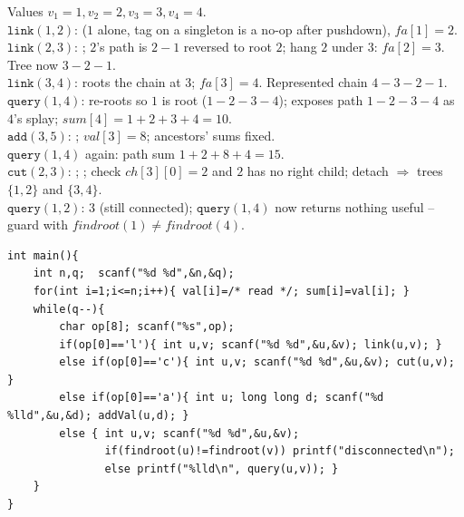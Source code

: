 \begin{tracebox}
Values \(v_1{=}1,v_2{=}2,v_3{=}3,v_4{=}4\).\\
\(\texttt{link}(1,2)\):  (\(1\) alone, tag on a singleton is a
no-op after pushdown), \(\mathit{fa}[1]{=}2\).\\
\(\texttt{link}(2,3)\): ; \(2\)'s path is \(2\!-\!1\) reversed to
root \(2\); hang \(2\) under \(3\): \(\mathit{fa}[2]{=}3\). Tree now \(3\!-\!2\!-\!1\).\\
\(\texttt{link}(3,4)\):  roots the chain at \(3\); \(\mathit{fa}[3]{=}4\).
Represented chain \(4\!-\!3\!-\!2\!-\!1\).\\
\(\texttt{query}(1,4)\):  re-roots so \(1\) is root
(\(1\!-\!2\!-\!3\!-\!4\));  exposes path \(1\!-\!2\!-\!3\!-\!4\) as
\(4\)'s splay; \(\mathit{sum}[4]=1{+}2{+}3{+}4=\boxed{10}\).\\
\(\texttt{add}(3,5)\): ; \(\mathit{val}[3]=8\); ancestors' sums fixed.\\
\(\texttt{query}(1,4)\) again: path sum \(1{+}2{+}8{+}4=\boxed{15}\).\\
\(\texttt{cut}(2,3)\): ; ; check \(\mathit{ch}[3][0]{=}2\)
and \(2\) has no right child; detach \(\Rightarrow\) trees \(\{1,2\}\) and \(\{3,4\}\).\\
\(\texttt{query}(1,2)\): \(\boxed{3}\) (still connected); \(\texttt{query}(1,4)\) now
returns nothing useful -- guard with \(\mathit{findroot}(1)\ne\mathit{findroot}(4)\).
\end{tracebox}

\begin{lstlisting}[caption={The worked path-sum driver (main only; reuse lst:c23-evert verbatim). Queries mirror YS ``dynamic tree vertex add path sum''. ASCII only}, label={lst:c23-pathsum}]
int main(){
    int n,q;  scanf("%d %d",&n,&q);
    for(int i=1;i<=n;i++){ val[i]=/* read */; sum[i]=val[i]; }
    while(q--){
        char op[8]; scanf("%s",op);
        if(op[0]=='l'){ int u,v; scanf("%d %d",&u,&v); link(u,v); }
        else if(op[0]=='c'){ int u,v; scanf("%d %d",&u,&v); cut(u,v); }
        else if(op[0]=='a'){ int u; long long d; scanf("%d %lld",&u,&d); addVal(u,d); }
        else { int u,v; scanf("%d %d",&u,&v);
               if(findroot(u)!=findroot(v)) printf("disconnected\n");
               else printf("%lld\n", query(u,v)); }
    }
}
\end{lstlisting}

